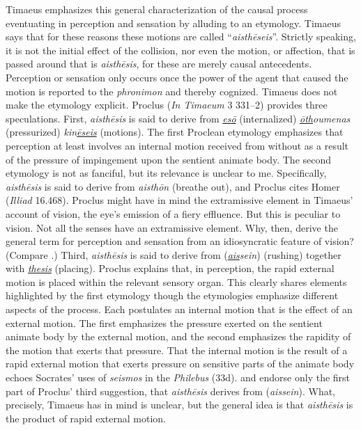 Timaeus emphasizes this general characterization of the causal process eventuating in perception and sensation by alluding to an etymology. Timaeus says that for these reasons these motions are called ``\emph{aisthēseis}''. Strictly speaking, it is not the initial effect of the collision, nor even the motion, or affection, that is passed around that is \emph{aisthēsis}, for these are merely causal antecedents. Perception or sensation only occurs once the power of the agent that caused the motion is reported to the \emph{phronimon} and thereby cognized. Timaeus does not make the etymology explicit. Proclus (\emph{In Timaeum} 3 331--2) provides three speculations. First, \emph{aisthēsis} is said to derive from \emph{\underline{esō}} (internalized) \emph{\underline{ōth}oumenas} (pressurized) \emph{kin\underline{ēseis}} (motions). The first Proclean etymology emphasizes that perception at least involves an internal motion received from without as a result of the pressure of impingement upon the sentient animate body. The second etymology is not as fanciful, but its relevance is unclear to me. Specifically, \emph{aisthēsis} is said to derive from \emph{aisthōn} (breathe out), and Proclus cites Homer (\emph{Illiad} 16.468). Proclus might have in mind the extramissive element in Timaeus' account of vision, the eye's emission of a fiery effluence. But this is peculiar to vision. Not all the senses have an extramissive element. Why, then, derive the general term for perception and sensation from an idiosyncratic feature of vision? (Compare \citealt{Broad:1952kx}.) Third, \emph{aisthēsis} is said to derive from (\emph{\underline{ais}sein}) (rushing) together with \emph{\underline{thesis}} (placing). Proclus explains that, in perception, the rapid external motion is placed within the relevant sensory organ. This clearly shares elements highlighted by the first etymology though the etymologies emphasize different aspects of the process. Each postulates an internal motion that is the effect of an external motion. The first emphasizes the pressure exerted on the sentient animate body by the external motion, and the second emphasizes the rapidity of the motion that exerts that pressure. That the internal motion is the result of a rapid external motion that exerts pressure on sensitive parts of the animate body echoes Socrates' uses of \emph{seismos} in the \emph{Philebus} (33d). \citet[149 n14]{Archer-Hind:1888qd} and \citet[94 n2]{Bury:1929jb} endorse only the first part of Proclus' third suggestion, that \emph{aisthēsis} derives from (\emph{aissein}). What, precisely, Timaeus has in mind is unclear, but the general idea is that \emph{aisthēsis} is the product of rapid external motion.

